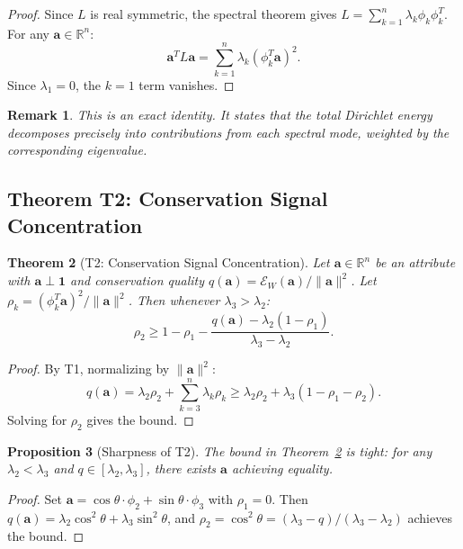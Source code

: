 \documentclass[12pt,letterpaper]{article}
\newtheorem{theorem}{Theorem}[section]
\newtheorem{proposition}[theorem]{Proposition}
\newtheorem{remark}[theorem]{Remark}
\newcommand{\R}{\mathbb{R}}
\newcommand{\One}{\mathbf{1}}
\newcommand{\bfa}{\mathbf{a}}
\newcommand{\cE}{\mathcal{E}}
\begin{document}
\begin{proof}
Since $L$ is real symmetric, the spectral theorem gives $L = \sum_{k=1}^{n} \lambda_k \phi_k \phi_k^T$. For any $\bfa \in \R^n$:
\[
  \bfa^T L \bfa = \sum_{k=1}^{n} \lambda_k (\phi_k^T \bfa)^2.
\]
Since $\lambda_1 = 0$, the $k=1$ term vanishes.
\end{proof}

\begin{remark}
This is an exact identity. It states that the total Dirichlet energy decomposes precisely into contributions from each spectral mode, weighted by the corresponding eigenvalue.
\end{remark}

\subsection{Theorem T2: Conservation Signal Concentration}

\begin{theorem}[T2: Conservation Signal Concentration]
\label{thm:T2}
Let $\bfa \in \R^n$ be an attribute with $\bfa \perp \One$ and conservation quality $q(\bfa) = \cE_W(\bfa)/\|\bfa\|^2$. Let $\rho_k = (\phi_k^T \bfa)^2 / \|\bfa\|^2$. Then whenever $\lambda_3 > \lambda_2$:
\begin{equation}
\label{eq:T2}
  \rho_2 \geq 1 - \rho_1 - \frac{q(\bfa) - \lambda_2(1 - \rho_1)}{\lambda_3 - \lambda_2}.
\end{equation}
\end{theorem}

\begin{proof}
By T1, normalizing by $\|\bfa\|^2$:
\[
  q(\bfa) = \lambda_2 \rho_2 + \sum_{k=3}^{n} \lambda_k \rho_k \geq \lambda_2 \rho_2 + \lambda_3(1 - \rho_1 - \rho_2).
\]
Solving for $\rho_2$ gives the bound.
\end{proof}

\begin{proposition}[Sharpness of T2]
\label{prop:T2-sharp}
The bound in Theorem~\ref{thm:T2} is tight: for any $\lambda_2 < \lambda_3$ and $q \in [\lambda_2, \lambda_3]$, there exists $\bfa$ achieving equality.
\end{proposition}

\begin{proof}
Set $\bfa = \cos\theta \cdot \phi_2 + \sin\theta \cdot \phi_3$ with $\rho_1 = 0$. Then $q(\bfa) = \lambda_2 \cos^2\theta + \lambda_3 \sin^2\theta$, and $\rho_2 = \cos^2\theta = (\lambda_3 - q)/(\lambda_3 - \lambda_2)$ achieves the bound.
\end{proof}
\end{document}
